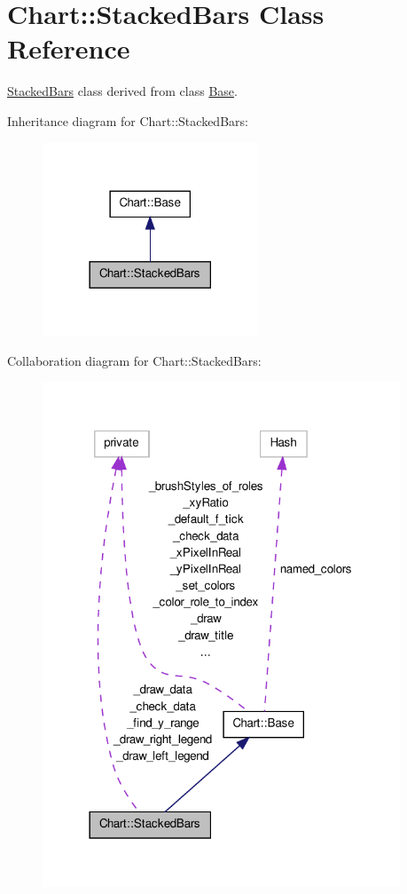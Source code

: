 \hypertarget{classChart_1_1StackedBars}{
\section{Chart::StackedBars Class Reference}
\label{classChart_1_1StackedBars}
}


\hyperlink{classChart_1_1StackedBars}{StackedBars} class derived from class \hyperlink{classChart_1_1Base}{Base}.  




Inheritance diagram for Chart::StackedBars:\nopagebreak
\begin{figure}[H]
\begin{center}
\leavevmode
\includegraphics[width=182pt]{classChart_1_1StackedBars__inherit__graph}
\end{center}
\end{figure}


Collaboration diagram for Chart::StackedBars:\nopagebreak
\begin{figure}[H]
\begin{center}
\leavevmode
\includegraphics[width=302pt]{classChart_1_1StackedBars__coll__graph}
\end{center}
\end{figure}
